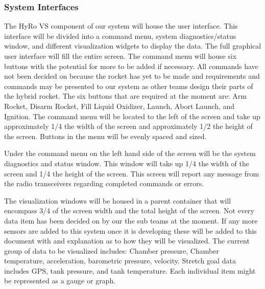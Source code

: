 \documentclass[10pt,draftclsnofoot,onecolumn,compsoc]{IEEEtran}
\begin{document}
\subsubsection{System Interfaces}
The HyRo VS component of our system will house the user interface. This interface will be divided into a command menu, system diagnostics/status window, and different visualization widgets to display the data. The full graphical user interface will fill the entire screen. The command menu will house six buttons with the potential for more to be added if necessary. All commands have not been decided on because the rocket has yet to be made and requirements and commands may be presented to our system as other teams design their parts of the hybrid rocket.  The six buttons that are required at the moment are: Arm Rocket, Disarm Rocket, Fill Liquid Oxidizer, Launch, Abort Launch, and Ignition. The command menu will be located to the left of the screen and take up approximately 1/4 the width of the screen and approximately 1/2 the height of the screen. Buttons in the menu will be evenly spaced and sized. \par

	Under the command menu on the left hand side of the screen will be the system diagnostics and status window. This window will take up 1/4 the width of the screen and 1/4 the height of the screen. This screen will report any message from the radio transceivers regarding completed commands or errors.\par
 
	The visualization windows will be housed in a parent container that will encompass 3/4 of the screen width and the total height of the screen. Not every data item has been decided on by our the sub teams at the moment.  If any more sensors are added to this system once it is developing these will be added to this document with and explanation as to how they will be visualized.  The current group of data to be visualized includes: Chamber pressure, Chamber temperature, acceleration, barometric pressure, velocity. Stretch goal data includes GPS, tank pressure, and tank temperature.   Each individual item might be represented as a gauge or graph.\par
\end{document}
